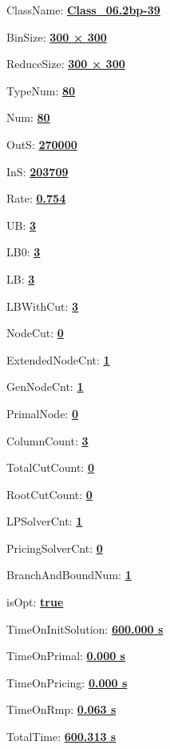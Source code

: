 \documentclass[11pt]{article}
\begin{document}
\pagestyle{empty}


ClassName: \underline{\textbf{Class_06.2bp-39}}
\par
BinSize: \underline{\textbf{300 × 300}}
\par
ReduceSize: \underline{\textbf{300 × 300}}
\par
TypeNum: \underline{\textbf{80}}
\par
Num: \underline{\textbf{80}}
\par
OutS: \underline{\textbf{270000}}
\par
InS: \underline{\textbf{203709}}
\par
Rate: \underline{\textbf{0.754}}
\par
UB: \underline{\textbf{3}}
\par
LB0: \underline{\textbf{3}}
\par
LB: \underline{\textbf{3}}
\par
LBWithCut: \underline{\textbf{3}}
\par
NodeCut: \underline{\textbf{0}}
\par
ExtendedNodeCnt: \underline{\textbf{1}}
\par
GenNodeCnt: \underline{\textbf{1}}
\par
PrimalNode: \underline{\textbf{0}}
\par
ColumnCount: \underline{\textbf{3}}
\par
TotalCutCount: \underline{\textbf{0}}
\par
RootCutCount: \underline{\textbf{0}}
\par
LPSolverCnt: \underline{\textbf{1}}
\par
PricingSolverCnt: \underline{\textbf{0}}
\par
BranchAndBoundNum: \underline{\textbf{1}}
\par
isOpt: \underline{\textbf{true}}
\par
TimeOnInitSolution: \underline{\textbf{600.000 s}}
\par
TimeOnPrimal: \underline{\textbf{0.000 s}}
\par
TimeOnPricing: \underline{\textbf{0.000 s}}
\par
TimeOnRmp: \underline{\textbf{0.063 s}}
\par
TotalTime: \underline{\textbf{600.313 s}}
\par
\newpage
\end{document}
